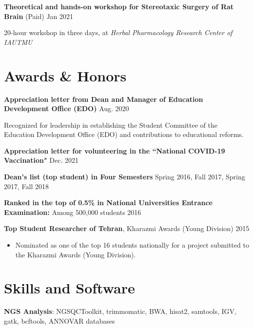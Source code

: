 \documentclass[letterpaper,11pt]{article} %
\begin{document}
\textbf{Theoretical and hands-on workshop for Stereotaxic Surgery of Rat Brain} (Paid) \hfill \footnotesize{Jan 2021} \normalsize
\vspace{-0.5\baselineskip}
\begin{adjustwidth}{0.5cm}{0cm}
20-hour workshop in three days, at \emph{Herbal Pharmacology Research Center of IAUTMU}
\end{adjustwidth}



\section{Awards \& Honors}
\textbf{Appreciation letter from Dean and Manager of Education Development Of\nolinebreak fice (EDO)} \hfill \footnotesize{Aug. 2020} \normalsize
\vspace{-0.5\baselineskip}
\begin{adjustwidth}{0.5cm}{2cm}
Recognized for leadership in establishing the Student Committee of the Education Development Of\nolinebreak fice (EDO) and contributions to educational reforms.
\end{adjustwidth}

\textbf{Appreciation letter for volunteering in the “National COVID-19 Vaccination"} \hfill \footnotesize{Dec. 2021} \normalsize

\textbf{Dean's list (top student) in Four Semesters} \hfill \footnotesize{Spring 2016, Fall 2017, Spring 2017, Fall 2018} \normalsize

\textbf{Ranked in the top of 0.5\% in National Universities Entrance Examination:} Among 500,000 students \hfill \footnotesize{2016}  \normalsize

\textbf{Top Student Researcher of Tehran}, \hypertarget{Kharazmi}{Kharazmi} Awards (Young Division) \hfill \footnotesize{2015} \normalsize
\vspace{-0.5\baselineskip}
\begin{itemize}
    \item Nominated as one of the top 16 students nationally for a project submitted to the Kharazmi Awards (Young Division).
\end{itemize}


\section{Skills and Software}

\textbf{NGS Analysis}: NGSQCToolkit, trimmomatic, BWA, hisat2, samtools, IGV, gatk, bcftools, ANNOVAR databases
\end{document}

